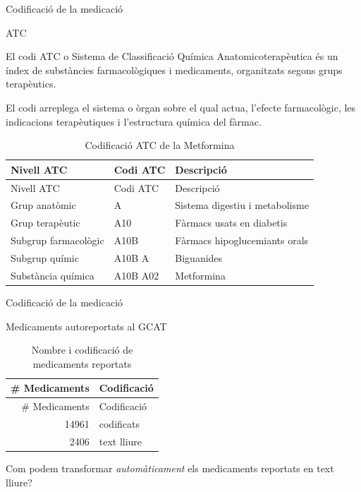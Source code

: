\documentclass[ignorenonframetext,]{beamer}
\begin{document}
\begin{frame}{Codificació de la medicació}

\begin{block}{ATC}

El codi ATC o Sistema de Classificació Química Anatomicoterapèutica és
un índex de substàncies farmacològiques i medicaments, organitzats
segons grups terapèutics.

El codi arreplega el sistema o òrgan sobre el qual actua, l'efecte
farmacològic, les indicacions terapèutiques i l'estructura química del
fàrmac.

\begin{longtable}[]{@{}lll@{}}
\caption{Codificació ATC de la Metformina}\tabularnewline
\toprule
Nivell ATC & Codi ATC & Descripció\tabularnewline
\midrule
\endfirsthead
\toprule
Nivell ATC & Codi ATC & Descripció\tabularnewline
\midrule
\endhead
Grup anatòmic & A & Sistema digestiu i metabolisme\tabularnewline
Grup terapèutic & A10 & Fàrmacs usats en diabetis\tabularnewline
Subgrup farmacològic & A10B & Fàrmacs hipoglucemiants
orals\tabularnewline
Subgrup químic & A10B A & Biguanides\tabularnewline
Substància química & A10B A02 & Metformina\tabularnewline
\bottomrule
\end{longtable}

\end{block}

\end{frame}

\begin{frame}{Codificació de la medicació}

\begin{block}{Medicaments autoreportats al GCAT}

\begin{longtable}[]{@{}rl@{}}
\caption{Nombre i codificació de medicaments reportats}\tabularnewline
\toprule
\# Medicaments & Codificació\tabularnewline
\midrule
\endfirsthead
\toprule
\# Medicaments & Codificació\tabularnewline
\midrule
\endhead
14961 & codificats\tabularnewline
2406 & text lliure\tabularnewline
\bottomrule
\end{longtable}

Com podem transformar \emph{automàticament} els medicaments reportats en
text lliure?

\end{block}

\end{frame}
\end{document}
